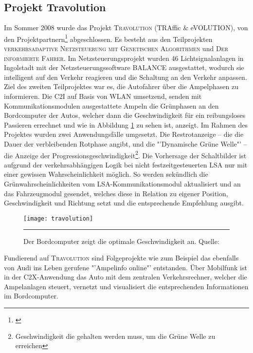 \subsection*{\label{sec:travolution}Projekt Travolution}
Im Sommer 2008 wurde das Projekt \textsc{Travolution} (TRAffic \& eVOLUTION), von den Projektpartnern\footnote{\cite{Travolution}} abgeschlossen. Es besteht aus den Teilprojekten \textsc{verkehrsadaptive Netzsteuerung mit Genetischen Algorithmen} und \textsc{Der informierte Fahrer}. Im Netzsteuerungsprojekt wurden 46 Lichtsignalanlagen in Ingolstadt mit der Netzsteuerungssoftware BALANCE ausgestattet, wodurch sie intelligent auf den Verkehr reagieren und die Schaltung an den Verkehr anpassen.  Ziel des zweiten Teilprojektes war es, die Autofahrer über die Ampelphasen zu informieren. Die \gls{C2I} auf Basis von \gls{WLAN} umsetzend, senden mit Kommunikationsmodulen ausgestattete Ampeln die Grünphasen an den Bordcomputer der Autos, welcher dann die Geschwindigkeit für ein reibungsloses Passieren errechnet\cite{Stvtechnik} und wie in Abbildung \ref{fig:travolution} zu sehen ist, anzeigt. Im Rahmen des Projektes wurden zwei Anwendungsfälle umgesetzt. Die Restrotanzeige -- die die Dauer der verbleibenden Rotphase angibt, und die "'Dynamische Grüne Welle"' -- die Anzeige der Progressionsgeschwindigkeit\footnote{ Geschwindigkeit die gehalten werden muss, um die Grüne Welle zu erreichen}.
Die Vorhersage der Schaltbilder ist aufgrund der verkehrsabhängigen Logik bei nicht festzeitgesteuerten \gls{LSA} nur mit einer gewissen Wahrscheinlichkeit möglich. So werden sekündlich die Grünwahrscheinlichkeiten vom \gls{LSA}-Kommunikationsmodul aktualisiert und an das Fahrzeugmodul gesendet, welches diese in Relation zu eigener Position, Geschwindigkeit und Richtung setzt und die entsprechende Empfehlung ausgibt.
\begin{figure}[H]  
    \centering  
    \texttt{[image: travolution]}   
    \rule{35em}{0.5pt}   
    \caption[Projekt Travolution]{Der Bordcomputer zeigt die optimale Geschwindigkeit an. Quelle: \cite{Travolution}}
    \label{fig:travolution}
\end{figure} 
Fundierend auf \textsc{Travolution} sind Folgeprojekte wie zum Beispiel das ebenfalls von Audi ins Leben gerufene "'Ampelinfo online"' entstanden. Über Mobilfunk ist in der \gls{C2X}-Anwendung das Auto mit dem zentralen Verkehrsrechner, welcher die Ampelanlagen steuert, vernetzt und visualisiert die entsprechenden Informationen im Bordcomputer. \cite{Ampelinfo}
